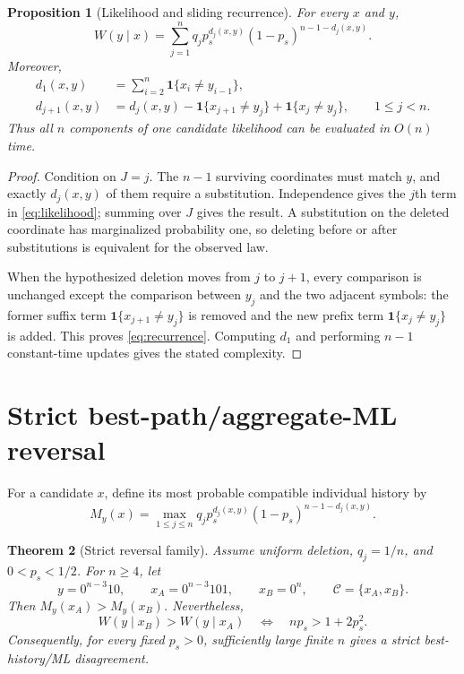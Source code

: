 \documentclass[11pt]{article}
\newtheorem{theorem}{Theorem}
\newtheorem{proposition}[theorem]{Proposition}
\theoremstyle{remark}
\newcommand{\C}{\mathcal C}
\newcommand{\ind}{\mathbf 1}
\begin{document}
\begin{proposition}[Likelihood and sliding recurrence]
For every $x$ and $y$,
\begin{equation}
 W(y\mid x)=\sum_{j=1}^{n}q_jp_s^{d_j(x,y)}(1-p_s)^{n-1-d_j(x,y)}.
 \label{eq:likelihood}
\end{equation}
Moreover,
\begin{align}
 d_1(x,y)&=\sum_{i=2}^{n}\ind\{x_i\ne y_{i-1}\},\\
 d_{j+1}(x,y)&=d_j(x,y)-\ind\{x_{j+1}\ne y_j\}+\ind\{x_j\ne y_j\},
 \qquad 1\le j<n.
 \label{eq:recurrence}
\end{align}
Thus all $n$ components of one candidate likelihood can be evaluated in $O(n)$ time.
\end{proposition}

\begin{proof}
Condition on $J=j$. The $n-1$ surviving coordinates must match $y$, and exactly
$d_j(x,y)$ of them require a substitution. Independence gives the $j$th term in
\eqref{eq:likelihood}; summing over $J$ gives the result. A substitution on the deleted
coordinate has marginalized probability one, so deleting before or after substitutions
is equivalent for the observed law.

When the hypothesized deletion moves from $j$ to $j+1$, every comparison is unchanged
except the comparison between $y_j$ and the two adjacent symbols: the former suffix term
$\ind\{x_{j+1}\ne y_j\}$ is removed and the new prefix term
$\ind\{x_j\ne y_j\}$ is added. This proves \eqref{eq:recurrence}. Computing $d_1$ and
performing $n-1$ constant-time updates gives the stated complexity.
\end{proof}

\section{Strict best-path/aggregate-ML reversal}

For a candidate $x$, define its most probable compatible individual history by
\[
 M_y(x)=\max_{1\le j\le n}q_jp_s^{d_j(x,y)}(1-p_s)^{n-1-d_j(x,y)}.
\]

\begin{theorem}[Strict reversal family]
Assume uniform deletion, $q_j=1/n$, and $0<p_s<1/2$. For $n\ge4$, let
\[
 y=0^{n-3}10,\qquad x_A=0^{n-3}101,\qquad x_B=0^n,
 \qquad \C=\{x_A,x_B\}.
\]
Then $M_y(x_A)>M_y(x_B)$. Nevertheless,
\[
 W(y\mid x_B)>W(y\mid x_A)
 \quad\Longleftrightarrow\quad
 np_s>1+2p_s^2.
\]
Consequently, for every fixed $p_s>0$, sufficiently large finite $n$ gives a strict
best-history/ML disagreement.
\end{theorem}
\end{document}
